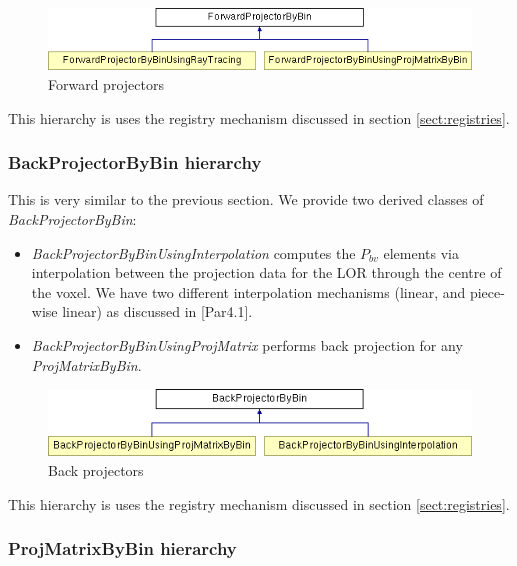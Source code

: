\documentclass{article}
\begin{document}
\begin{figure}[htbp]
\begin{center}
\includegraphics[bb = 0 0 543 79, scale=0.52]{graphics/STIR-developers-overviewFig10}
\caption{Forward projectors}
\end{center}
\end{figure}
This hierarchy is uses the registry mechanism discussed in section 
\ref{sect:registries}.

\subsubsection{
BackProjectorByBin hierarchy}

This is very similar to the previous section. We provide two 
derived classes of \textit{BackProjectorByBin}: 
\begin{itemize}
\item 
\textit{BackProjectorByBinUsingInterpolation} computes the $P_{bv}$ 
elements via interpolation between the projection data for the 
LOR through the centre of the voxel. We have two different interpolation 
mechanisms (linear, and piece-wise linear) as discussed in [Par4.1].
\item 
\textit{BackProjectorByBinUsingProjMatrix} performs back projection 
for any \textit{ProjMatrixByBin}. 
\end{itemize}

\begin{figure}[htbp]
\begin{center}
\includegraphics[bb = 0 0 503 79, scale=0.52]{graphics/STIR-developers-overviewFig11}
\caption{Back projectors}
\end{center}
\end{figure}

This hierarchy is uses the registry mechanism discussed in section 
\ref{sect:registries}.

\subsubsection{
ProjMatrixByBin hierarchy}
\end{document}
